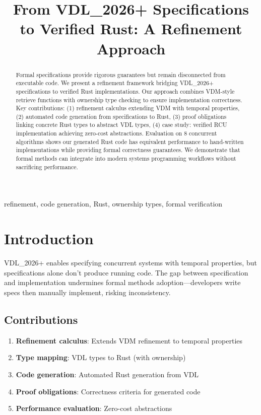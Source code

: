 \documentclass[conference]{IEEEtran}
\begin{document}
\title{From VDL\_2026+ Specifications to Verified Rust: A Refinement Approach}
\author{}
\maketitle

\begin{abstract}
Formal specifications provide rigorous guarantees but remain disconnected from executable code. We present a refinement framework bridging VDL\_2026+ specifications to verified Rust implementations. Our approach combines VDM-style retrieve functions with ownership type checking to ensure implementation correctness. Key contributions: (1) refinement calculus extending VDM with temporal properties, (2) automated code generation from specifications to Rust, (3) proof obligations linking concrete Rust types to abstract VDL types, (4) case study: verified RCU implementation achieving zero-cost abstractions. Evaluation on 8 concurrent algorithms shows our generated Rust code has equivalent performance to hand-written implementations while providing formal correctness guarantees. We demonstrate that formal methods can integrate into modern systems programming workflows without sacrificing performance.
\end{abstract}

\begin{IEEEkeywords}
refinement, code generation, Rust, ownership types, formal verification
\end{IEEEkeywords}

\section{Introduction}

VDL\_2026+ enables specifying concurrent systems with temporal properties, but specifications alone don't produce running code. The gap between specification and implementation undermines formal methods adoption---developers write specs then manually implement, risking inconsistency.

\subsection{Contributions}

\begin{enumerate}
\item \textbf{Refinement calculus}: Extends VDM refinement to temporal properties
\item \textbf{Type mapping}: VDL types to Rust (with ownership)
\item \textbf{Code generation}: Automated Rust generation from VDL
\item \textbf{Proof obligations}: Correctness criteria for generated code
\item \textbf{Performance evaluation}: Zero-cost abstractions
\end{enumerate}
\end{document}
